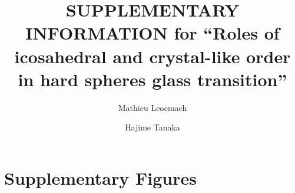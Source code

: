 \documentclass[reprint,notitlepage]{revtex4-1}
\begin{document}
\title{SUPPLEMENTARY INFORMATION for ``Roles of icosahedral and crystal-like order \\ in hard spheres glass transition''} 


\author{Mathieu Leocmach} 

\author{Hajime Tanaka}


\maketitle
\onecolumngrid

\section*{Supplementary Figures}
\end{document}
